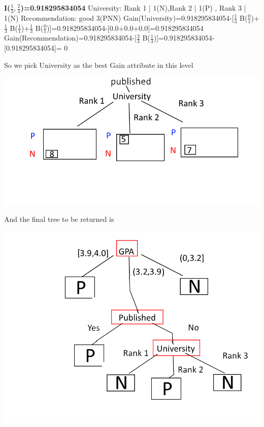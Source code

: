 \documentclass[12pt, letterpaper]{article}
\begin{document}
\textbf{I($\frac{1}{3},\frac{2}{3}$)=0.918295834054}\newline	
University: Rank 1 | 1(N),Rank 2 | 1(P) , Rank 3 | 1(N)\newline
Recommendation: good 3(PNN)\newline
Gain(University)=0.918295834054-[$\frac{1}{3}$ B($\frac{0}{1}$)+$\frac{1}{3}$ B($\frac{1}{1}$)+$\frac{1}{3}$ B($\frac{0}{1}$)]=0.918295834054-[0.0+0.0+0.0]=0.918295834054\newline\newline
Gain(Recommendation)=0.918295834054-[$\frac{3}{3}$ B($\frac{1}{3}$)]=0.918295834054-[0.918295834054]= 0\newline

So we pick University as the best Gain attribute in this level

\includegraphics[scale=0.8]{"problem-2-step3"}


And the final tree to be returned is

\includegraphics[scale=0.6]{"problem-2-final"}
\end{document}
